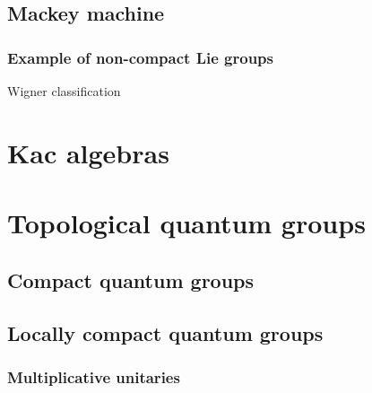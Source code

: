 \documentclass{../../large}
\begin{document}
\chapter{Mackey machine}
\section{Example of non-compact Lie groups}
Wigner classification








\part{Kac algebras}





\part{Topological quantum groups}
\chapter{Compact quantum groups}
\chapter{Locally compact quantum groups}
\section{Multiplicative unitaries}
\end{document}
